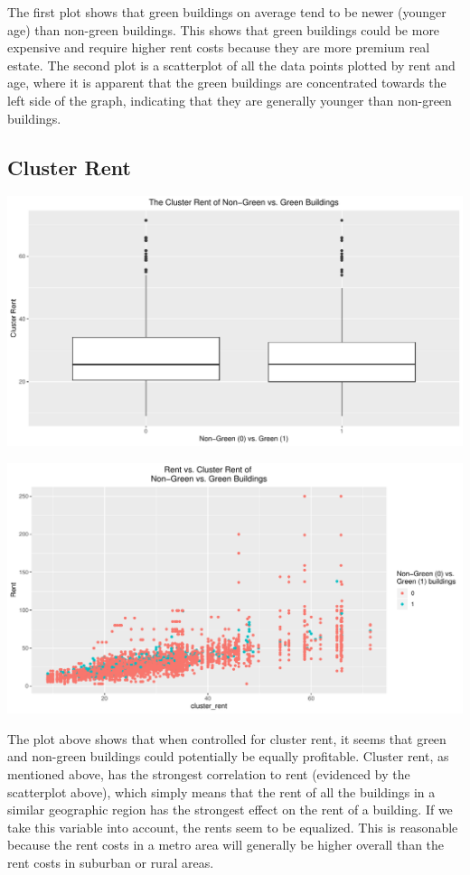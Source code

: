 \documentclass[]{article}
\begin{document}
The first plot shows that green buildings on average tend to be newer
(younger age) than non-green buildings. This shows that green buildings
could be more expensive and require higher rent costs because they are
more premium real estate. The second plot is a scatterplot of all the
data points plotted by rent and age, where it is apparent that the green
buildings are concentrated towards the left side of the graph,
indicating that they are generally younger than non-green buildings.

\hypertarget{cluster-rent}{%
\subsection{Cluster Rent}\label{cluster-rent}}

\includegraphics{Report_files/figure-latex/cluster_box-1.pdf}

\includegraphics{Report_files/figure-latex/cluster_scatter-1.pdf}

The plot above shows that when controlled for cluster rent, it seems
that green and non-green buildings could potentially be equally
profitable. Cluster rent, as mentioned above, has the strongest
correlation to rent (evidenced by the scatterplot above), which simply
means that the rent of all the buildings in a similar geographic region
has the strongest effect on the rent of a building. If we take this
variable into account, the rents seem to be equalized. This is
reasonable because the rent costs in a metro area will generally be
higher overall than the rent costs in suburban or rural areas.
\end{document}
